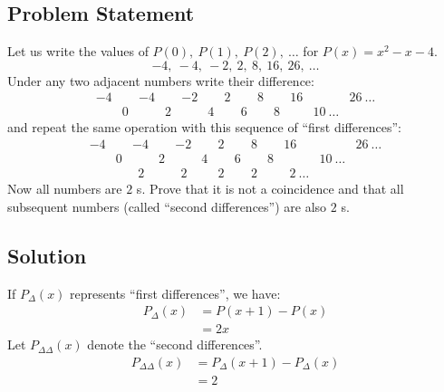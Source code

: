 \documentclass[12pt]{article}
\begin{document}
\subsection*{Problem Statement}
Let us write the values of $P(0),\ P(1),\ P(2),\ \ldots$ for $P(x) = x^2-x-4$.
\[
	-4,\ -4,\ -2,\ 2,\ 8,\ 16,\ 26,\ \ldots
\]
Under any two adjacent numbers write their difference:
\[
\begin{array}{lllllllllllll}
	-4 &   & -4 &   & -2 &   & 2 &   & 8 &   & 16 &    & 26\ \ldots\\
	   & 0 &    & 2 &    & 4 &   & 6 &   & 8 &    & 10\ \ldots &
\end{array}
\]
and repeat the same operation with this sequence of ``first differences'':
\[
\begin{array}{lllllllllllll}
	-4 &   & -4 &   & -2 &   & 2 &   & 8 &   & 16 &    & 26\ \dots\\
	   & 0 &    & 2 &    & 4 &   & 6 &   & 8 &    & 10\ \ldots &   \\
	   &   & \ \ 2 &   &\ \ 2 &   & 2 &   & 2 &   &\ \ 2\ \ldots &    &
\end{array}
\]
Now all numbers are $2$ s. Prove that it is not a coincidence and that all subsequent numbers (called ``second differences'') are also $2$ s.
\subsection*{Solution}
If $P_{\Delta}(x)$ represents ``first differences'', we have:
\begin{equation*}
	\begin{aligned}
		P_{\Delta}(x) &= P(x+1)-P(x)\\
					  &= 2x
	\end{aligned}
\end{equation*}
Let $P_{\Delta \Delta}(x)$ denote the ``second differences''.
\begin{equation*}
	\begin{aligned}
		P_{\Delta \Delta}(x) &= P_{\Delta}(x+1)-P_{\Delta}(x)\\
		                  &= 2
	\end{aligned}
\end{equation*}
\end{document}
